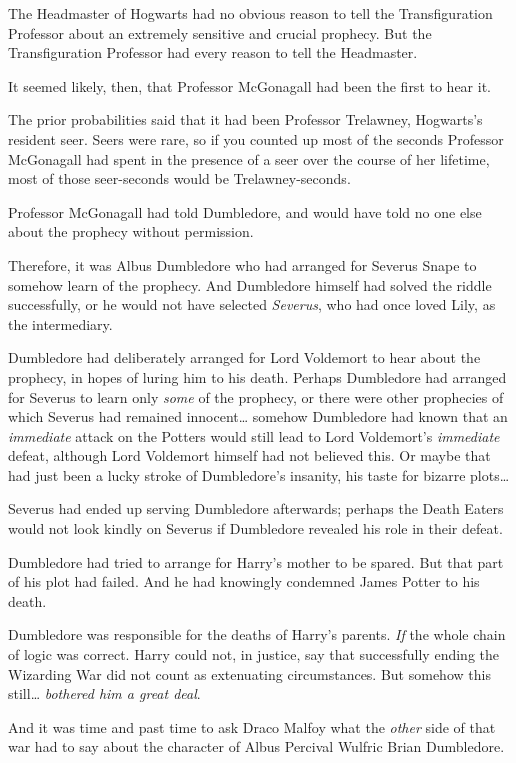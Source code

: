 The Headmaster of Hogwarts had no obvious reason to tell the Transfiguration Professor about an extremely sensitive and crucial prophecy. But the Transfiguration Professor had every reason to tell the Headmaster.

It seemed likely, then, that Professor McGonagall had been the first to hear it.

The prior probabilities said that it had been Professor Trelawney, Hogwarts's resident seer. Seers were rare, so if you counted up most of the seconds Professor McGonagall had spent in the presence of a seer over the course of her lifetime, most of those seer-seconds would be Trelawney-seconds.

Professor McGonagall had told Dumbledore, and would have told no one else about the prophecy without permission.

Therefore, it was Albus Dumbledore who had arranged for Severus Snape to somehow learn of the prophecy. And Dumbledore himself had solved the riddle successfully, or he would not have selected \emph{Severus}, who had once loved Lily, as the intermediary.

Dumbledore had deliberately arranged for Lord Voldemort to hear about the prophecy, in hopes of luring him to his death. Perhaps Dumbledore had arranged for Severus to learn only \emph{some} of the prophecy, or there were other prophecies of which Severus had remained innocent{\ldots} somehow Dumbledore had known that an \emph{immediate} attack on the Potters would still lead to Lord Voldemort's \emph{immediate} defeat, although Lord Voldemort himself had not believed this. Or maybe that had just been a lucky stroke of Dumbledore's insanity, his taste for bizarre plots{\ldots}

Severus had ended up serving Dumbledore afterwards; perhaps the Death Eaters would not look kindly on Severus if Dumbledore revealed his role in their defeat.

Dumbledore had tried to arrange for Harry's mother to be spared. But that part of his plot had failed. And he had knowingly condemned James Potter to his death.

Dumbledore was responsible for the deaths of Harry's parents. \emph{If} the whole chain of logic was correct. Harry could not, in justice, say that successfully ending the Wizarding War did not count as extenuating circumstances. But somehow this still{\ldots} \emph{bothered him a great deal}.

And it was time and past time to ask Draco Malfoy what the \emph{other} side of that war had to say about the character of Albus Percival Wulfric Brian Dumbledore.

